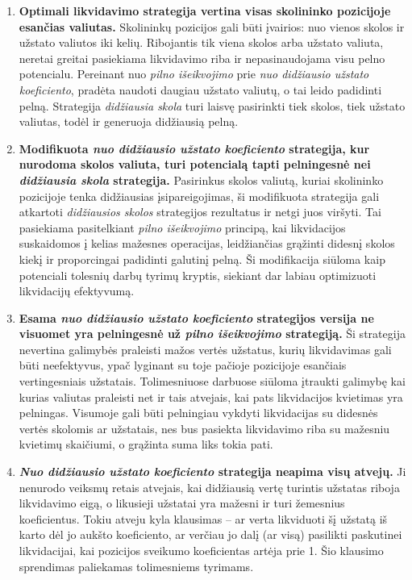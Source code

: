 \documentclass[]{VUMIFTemplateClass}
\begin{document}
\begin{enumerate}
  \item \textbf{Optimali likvidavimo strategija vertina visas skolininko pozicijoje esančias valiutas.} Skolininkų pozicijos gali būti įvairios: nuo vienos skolos ir užstato valiutos iki kelių. Ribojantis tik viena skolos arba užstato valiuta, neretai greitai pasiekiama likvidavimo riba ir nepasinaudojama visu pelno potencialu. Pereinant nuo \textit{pilno išeikvojimo} prie \textit{nuo didžiausio užstato koeficiento}, pradėta naudoti daugiau užstato valiutų, o tai leido padidinti pelną. Strategija \textit{didžiausia skola} turi laisvę pasirinkti tiek skolos, tiek užstato valiutas, todėl ir generuoja didžiausią pelną.

  \item \textbf{Modifikuota \textit{nuo didžiausio užstato koeficiento} strategija, kur nurodoma skolos valiuta, turi potencialą tapti pelningesnė nei \textit{didžiausia skola} strategija.} Pasirinkus skolos valiutą, kuriai skolininko pozicijoje tenka didžiausias įsipareigojimas, ši modifikuota strategija gali atkartoti \textit{didžiausios skolos} strategijos rezultatus ir netgi juos viršyti. Tai pasiekiama pasitelkiant \textit{pilno išeikvojimo} principą, kai likvidacijos suskaidomos į kelias mažesnes operacijas, leidžiančias grąžinti didesnį skolos kiekį ir proporcingai padidinti galutinį pelną. Ši modifikacija siūloma kaip potenciali tolesnių darbų tyrimų kryptis, siekiant dar labiau optimizuoti likvidacijų efektyvumą.

  \item \textbf{Esama \textit{nuo didžiausio užstato koeficiento} strategijos versija ne visuomet yra pelningesnė už \textit{pilno išeikvojimo} strategiją.} Ši strategija nevertina galimybės praleisti mažos vertės užstatus, kurių likvidavimas gali būti neefektyvus, ypač lyginant su toje pačioje pozicijoje esančiais vertingesniais užstatais. Tolimesniuose darbuose siūloma įtraukti galimybę kai kurias valiutas praleisti net ir tais atvejais, kai pats likvidacijos kvietimas yra pelningas. Visumoje gali būti pelningiau vykdyti likvidacijas su didesnės vertės skolomis ar užstatais, nes bus pasiekta likvidavimo riba su mažesniu kvietimų skaičiumi, o grąžinta suma liks tokia pati.

  \item \textbf{\textit{Nuo didžiausio užstato koeficiento} strategija neapima visų atvejų.} Ji nenurodo veiksmų retais atvejais, kai didžiausią vertę turintis užstatas riboja likvidavimo eigą, o likusieji užstatai yra mažesni ir turi žemesnius koeficientus. Tokiu atveju kyla klausimas – ar verta likviduoti šį užstatą iš karto dėl jo aukšto koeficiento, ar verčiau jo dalį (ar visą) pasilikti paskutinei likvidacijai, kai pozicijos sveikumo koeficientas artėja prie 1. Šio klausimo sprendimas paliekamas tolimesniems tyrimams.
\end{enumerate}
\end{document}
